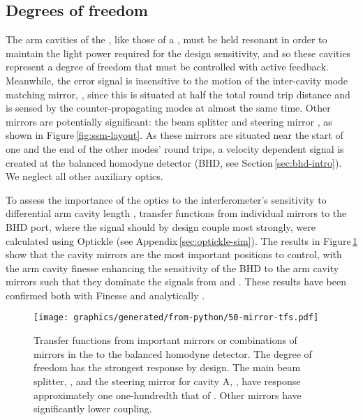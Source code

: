 \subsection{\label{sec:ssm-dofs}Degrees of freedom}
The arm cavities of the \SSM{}, like those of a \FPMI{}, must be held resonant in order to maintain the light power required for the design sensitivity, and so these cavities represent a degree of freedom that must be controlled with active feedback. Meanwhile, the error signal is insensitive to the motion of the inter-cavity mode matching mirror, \MNINE{}, since this is situated at half the total round trip distance and is sensed by the counter-propagating modes at almost the same time. Other mirrors are potentially significant: the beam splitter \MSIX{} and steering mirror \MSEVEN{}, as shown in Figure\,\ref{fig:ssm-layout}. As these mirrors are situated near the start of one and the end of the other modes' round trips, a velocity dependent signal is created at the balanced homodyne detector (\gls{BHD}, see Section\,\ref{sec:bhd-intro}). We neglect all other auxiliary optics.

To assess the importance of the optics to the interferometer's sensitivity to differential arm cavity length \LMINUS{}, transfer functions from individual mirrors to the \gls{BHD} port, where the \LMINUS{} signal should by design couple most strongly, were calculated using Optickle (see Appendix\,\ref{sec:optickle-sim}). The results in Figure\,\ref{fig:ssm-mirror-tfs} show that the cavity mirrors are the most important positions to control, with the arm cavity finesse enhancing the sensitivity of the \gls{BHD} to the arm cavity mirrors such that they dominate the signals from \MSIX{} and \MSEVEN{}. These results have been confirmed both with Finesse and analytically \cite{Glaefke2015}.

\begin{figure}
  \centering
  \texttt{[image: graphics/generated/from-python/50-mirror-tfs.pdf]}
  \caption[Transfer functions from important mirrors/combinations of mirrors in the \SSMEXPT{} to the balanced homodyne detector]{\label{fig:ssm-mirror-tfs}Transfer functions from important mirrors or combinations of mirrors in the \SSMEXPT{} to the balanced homodyne detector. The \LMINUS{} degree of freedom has the strongest response by design. The main beam splitter, \MSIX{}, and the steering mirror for cavity A, \MSEVEN{}, have response approximately one one-hundredth that of \LMINUS{}. Other mirrors have significantly lower coupling.}
\end{figure}


